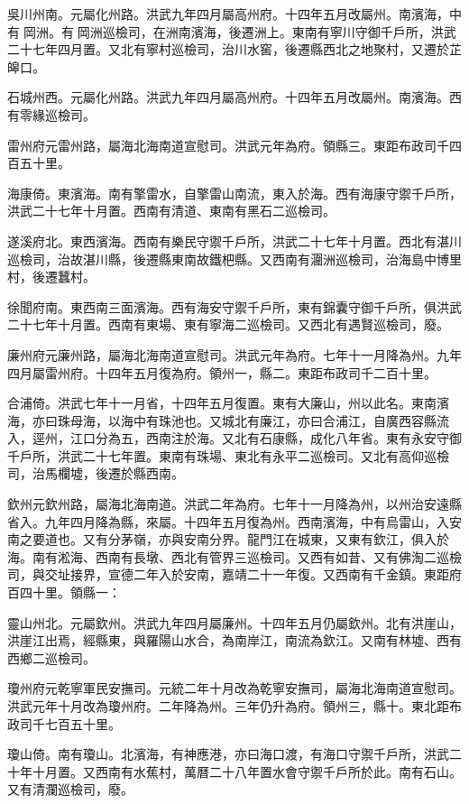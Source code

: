 吳川州南。元屬化州路。洪武九年四月屬高州府。十四年五月改屬州。南濱海，中有岡洲。有岡洲巡檢司，在洲南濱海，後遷洲上。東南有寧川守御千戶所，洪武二十七年四月置。又北有寧村巡檢司，治川水窖，後遷縣西北之地聚村，又遷於芷皞口。

石城州西。元屬化州路。洪武九年四月屬高州府。十四年五月改屬州。南濱海。西有零緣巡檢司。

雷州府元雷州路，屬海北海南道宣慰司。洪武元年為府。領縣三。東距布政司千四百五十里。

海康倚。東濱海。南有擎雷水，自擎雷山南流，東入於海。西有海康守禦千戶所，洪武二十七年十月置。西南有清道、東南有黑石二巡檢司。

遂溪府北。東西濱海。西南有樂民守禦千戶所，洪武二十七年十月置。西北有湛川巡檢司，治故湛川縣，後遷縣東南故鐵杷縣。又西南有潿洲巡檢司，治海島中博里村，後遷蠶村。

徐聞府南。東西南三面濱海。西有海安守禦千戶所，東有錦囊守御千戶所，俱洪武二十七年十月置。西南有東場、東有寧海二巡檢司。又西北有遇賢巡檢司，廢。

廉州府元廉州路，屬海北海南道宣慰司。洪武元年為府。七年十一月降為州。九年四月屬雷州府。十四年五月復為府。領州一，縣二。東距布政司千二百十里。

合浦倚。洪武七年十一月省，十四年五月復置。東有大廉山，州以此名。東南濱海，亦曰珠母海，以海中有珠池也。又城北有廉江，亦曰合浦江，自廣西容縣流入，逕州，江口分為五，西南注於海。又北有石康縣，成化八年省。東有永安守御千戶所，洪武二十七年置。東南有珠場、東北有永平二巡檢司。又北有高仰巡檢司，治馬欄墟，後遷於縣西南。

欽州元欽州路，屬海北海南道。洪武二年為府。七年十一月降為州，以州治安遠縣省入。九年四月降為縣，來屬。十四年五月復為州。西南濱海，中有烏雷山，入安南之要道也。又有分茅嶺，亦與安南分界。龍門江在城東，又東有欽江，俱入於海。南有淞海、西南有長墩、西北有管界三巡檢司。又西有如昔、又有佛淘二巡檢司，與交址接界，宣德二年入於安南，嘉靖二十一年復。又西南有千金鎮。東距府百四十里。領縣一：

靈山州北。元屬欽州。洪武九年四月屬廉州。十四年五月仍屬欽州。北有洪崖山，洪崖江出焉，經縣東，與羅陽山水合，為南岸江，南流為欽江。又南有林墟、西有西鄉二巡檢司。

瓊州府元乾寧軍民安撫司。元統二年十月改為乾寧安撫司，屬海北海南道宣慰司。洪武元年十月改為瓊州府。二年降為州。三年仍升為府。領州三，縣十。東北距布政司千七百五十里。

瓊山倚。南有瓊山。北濱海，有神應港，亦曰海口渡，有海口守禦千戶所，洪武二十年十月置。又西南有水蕉村，萬曆二十八年置水會守禦千戶所於此。南有石山。又有清瀾巡檢司，廢。

